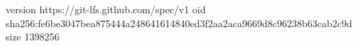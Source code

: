 version https://git-lfs.github.com/spec/v1
oid sha256:fe6be3047bea875444a248641614840ed3f2aa2aca9669d8c96238b63cab2c9d
size 1398256
